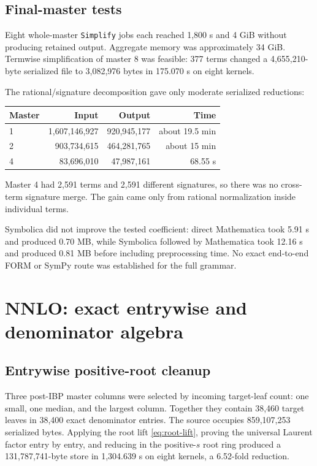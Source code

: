 \documentclass[11pt]{article}
\newcommand{\code}[1]{\texttt{#1}}
\begin{document}
\subsection{Final-master tests}

Eight whole-master \code{Simplify} jobs each reached 1,800 s and 4 GiB without
producing retained output.  Aggregate memory was approximately 34 GiB.
Termwise simplification of master 8 was feasible: 377 terms changed a
4,655,210-byte serialized file to 3,082,976 bytes in 175.070 s on eight
kernels.

The rational/signature decomposition gave only moderate serialized
reductions:
\begin{center}
\begin{tabular}{@{}lrrr@{}}
\toprule
Master & Input & Output & Time \\
\midrule
1 & 1,607,146,927 & 920,945,177 & about 19.5 min \\
2 & 903,734,615 & 464,281,765 & about 15 min \\
4 & 83,696,010 & 47,987,161 & 68.55 s \\
\bottomrule
\end{tabular}
\end{center}
\par\medskip
Master 4 had 2,591 terms and 2,591 different signatures, so there was no
cross-term signature merge.  The gain came only from rational normalization
inside individual terms.

Symbolica did not improve the tested coefficient: direct Mathematica took
5.91 s and produced 0.70 MB, while Symbolica followed by Mathematica took
12.16 s and produced 0.81 MB before including preprocessing time.  No exact
end-to-end FORM or SymPy route was established for the full grammar.

\section{NNLO: exact entrywise and denominator algebra}

\subsection{Entrywise positive-root cleanup}

Three post-IBP master columns were selected by incoming target-leaf count:
one small, one median, and the largest column.  Together they contain 38,460
target leaves in 38,400 exact denominator entries.  The source occupies
859,107,253 serialized bytes.  Applying the root lift
\eqref{eq:root-lift}, proving the universal Laurent factor entry by entry, and
reducing in the positive-$s$ root ring produced a 131,787,741-byte store in
1,304.639 s on eight kernels, a 6.52-fold reduction.
\end{document}
